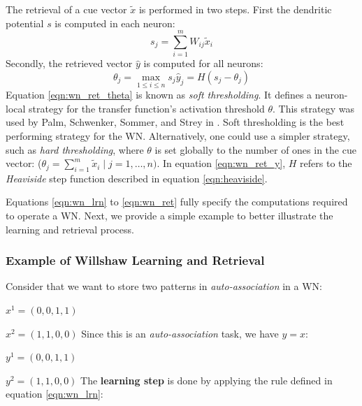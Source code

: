 \documentclass[runningheads]{llncs}
\begin{document}
The retrieval of a cue vector $\tilde{x}$ is performed in two steps. First the dendritic potential $s$ is computed in each neuron:
\begin{equation}
\label{eqn:dendritic}
    s_{j}=\sum_{i=1}^{m} W_{i j} \tilde{x}_{i}
\end{equation}
Secondly, the retrieved vector $\hat{y}$ is computed for all neurons:
\begin{subequations}
\label{eqn:wn_ret}
\begin{equation}
    \theta_{j}=\max _{1 \leq i \leq n} s_j
\label{eqn:wn_ret_theta}
\end{equation}
\begin{equation}
\label{eqn:wn_ret_y}
    \hat{y}_{j}=H\left(s_{j}-\theta_{j}\right)
\end{equation}
\end{subequations}
Equation \ref{eqn:wn_ret_theta} is known as\textit{ soft thresholding}. It defines a neuron-local strategy for the transfer function's activation threshold $\theta$. This strategy was used by Palm, Schwenker, Sommer, and Strey in \cite{palm1992information,gunther1997neural}. Soft thresholding is the best performing strategy for the WN. Alternatively, one could use a simpler strategy, such as \textit{hard thresholding}, where $\theta$ is set globally to the number of ones in the cue vector: ($\theta_j=\sum_{i=1}^{m} \tilde{x}_i \mid j=1, \dots , n)$.
In equation \ref{eqn:wn_ret_y}, $H$ refers to the \textit{Heaviside} step function described in equation \ref{eqn:heaviside}.

Equations \ref{eqn:wn_lrn} to \ref{eqn:wn_ret} fully specify the computations required to operate a WN. Next, we provide a simple example to better illustrate the learning and retrieval process.
\newpage
\subsubsection{Example of Willshaw Learning and Retrieval}
\label{sec:wn_example}

Consider that we want to store two patterns in \textit{auto-association} in a WN:

$x^{1} = (0,0,1,1)$

$x^{2} = (1,1,0,0)$
\newline
Since this is an \textit{auto-association} task, we have $y=x$:

$y^{1} = (0,0,1,1)$

$y^{2} = (1,1,0,0)$
\newline
\newline
The \textbf{learning step} is done by applying the rule defined in equation \ref{eqn:wn_lrn}:
\newline
\end{document}
